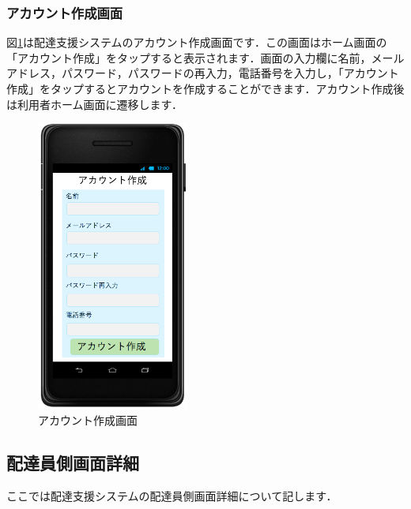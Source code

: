 \documentclass[a4j,titlepage]{jarticle}
\begin{document}
\subsubsection{アカウント作成画面}
図\ref{fig:account_create}は配達支援システムのアカウント作成画面です．この画面はホーム画面の「アカウント作成」をタップすると表示されます．画面の入力欄に名前，メールアドレス，パスワード，パスワードの再入力，電話番号を入力し，「アカウント作成」をタップするとアカウントを作成することができます．アカウント作成後は利用者ホーム画面に遷移します．

\begin{figure}[H]
 \begin{center}
  \includegraphics[width=50mm]{account_create.png}
	\caption{アカウント作成画面}
	\label{fig:account_create}
 \end{center}

\end{figure}

\subsection{配達員側画面詳細}
ここでは配達支援システムの配達員側画面詳細について記します．
\end{document}

